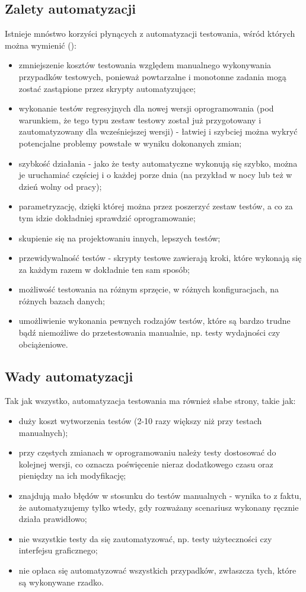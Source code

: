 \subsection{Zalety automatyzacji}

Istnieje mnóstwo korzyści płynących z automatyzacji testowania, wśród których można wymienić (\cite{io}):

\begin{itemize}
\item zmniejszenie kosztów testowania względem manualnego wykonywania przypadków testowych, ponieważ powtarzalne i monotonne zadania mogą zostać zastąpione przez skrypty automatyzujące;
\item wykonanie testów regresyjnych dla nowej wersji oprogramowania (pod warunkiem, że tego typu zestaw testowy został już przygotowany i zautomatyzowany dla wcześniejszej wersji) - łatwiej i szybciej można wykryć potencjalne problemy powstałe w wyniku dokonanych zmian;
\item szybkość działania - jako że testy automatyczne wykonują się szybko, można je uruchamiać częściej i o każdej porze dnia (na przykład w nocy lub też w dzień wolny od pracy);
\item parametryzację, dzięki której można przez poszerzyć zestaw testów, a co za tym idzie dokładniej sprawdzić oprogramowanie;
\item skupienie się na projektowaniu innych, lepszych testów;
\item przewidywalność testów - skrypty testowe zawierają kroki, które wykonają się za każdym razem w dokładnie ten sam sposób;
\item możliwość testowania na różnym sprzęcie, w różnych konfiguracjach, na różnych bazach danych;
\item umożliwienie wykonania pewnych rodzajów testów, które są bardzo trudne bądź niemożliwe do przetestowania manualnie, np. testy wydajności czy obciążeniowe.
\end{itemize}


\subsection{Wady automatyzacji} 

Tak jak wszystko, automatyzacja testowania ma również słabe strony, takie jak:
\begin{itemize}
\item duży koszt wytworzenia testów (2-10 razy większy niż przy testach manualnych);
\item przy częstych zmianach w oprogramowaniu należy testy dostosować do kolejnej wersji, co oznacza poświęcenie nieraz dodatkowego czasu oraz pieniędzy na ich modyfikację;
\item znajdują mało błędów w stosunku do testów manualnych - wynika to z faktu, że automatyzujemy tylko wtedy, gdy rozważany scenariusz wykonany ręcznie działa prawidłowo;
\item nie wszystkie testy da się zautomatyzować, np. testy użyteczności czy interfejsu graficznego;
\item nie opłaca się automatyzować wszystkich przypadków, zwłaszcza tych, które są wykonywane rzadko.
\end{itemize}


